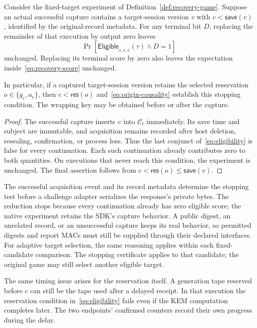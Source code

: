 \begin{corollary}
\label{cor:target-acquisition-stop}
Consider the fixed-target experiment of
Definition~\ref{def:recovery-game}.  Suppose an actual successful capture
contains a target-session version $v$ with $c<\mathsf{save}(v)$, identified
by the original-record metadata.  For any terminal bit $D$, replacing the
remainder of that execution by output zero leaves
\[
   \Pr[\mathsf{Eligible}_{s,e,c}(\tau)\wedge D=1]
\]
unchanged.  Replacing its terminal score by zero also leaves the expectation
inside~\eqref{eq:recovery-score} unchanged.

In particular, if a captured target-session version retains the selected
reservation $o\in\{g_e,a_e\}$, then
$c<\mathsf{res}(o)$ and~\eqref{eq:origin-causality} establish this stopping
condition.  The wrapping key may be obtained before or after the capture.
\end{corollary}

\begin{proof}
The successful capture inserts $v$ into $\mathcal C_t$ immediately.
Its save time and subject are immutable, and acquisition remains recorded
after host deletion, resealing, confirmation, or process loss.  Thus the
last conjunct of~\eqref{eq:eligibility} is false for every continuation.
Each such continuation already contributes zero to both quantities.
On executions that never reach this condition, the experiment is unchanged.
The final assertion follows from
$c<\mathsf{res}(o)\leq\mathsf{save}(v)$.
\end{proof}

The successful acquisition event and its record metadata determine the
stopping test before a challenge adapter serializes the response's private
bytes. The reduction stops because every continuation already has zero
eligible score; the native experiment retains the SDK's capture behavior.
A public digest, an unrelated record, or an unsuccessful capture keeps its
real behavior, so permitted digests and report MACs must still be supplied
through their declared interfaces.
For adaptive target selection, the same reasoning applies within each
fixed-candidate comparison. The stopping certificate applies to that
candidate; the original game may still select another eligible target.

The same timing issue arises for the reservation itself. A generation
tape reserved before $c$ can still be the tape used after a delayed
receipt. In that execution the reservation condition
in~\eqref{eq:eligibility} fails even if the KEM computation completes
later. The two endpoints' confirmed counters record their own progress
during the delay.

